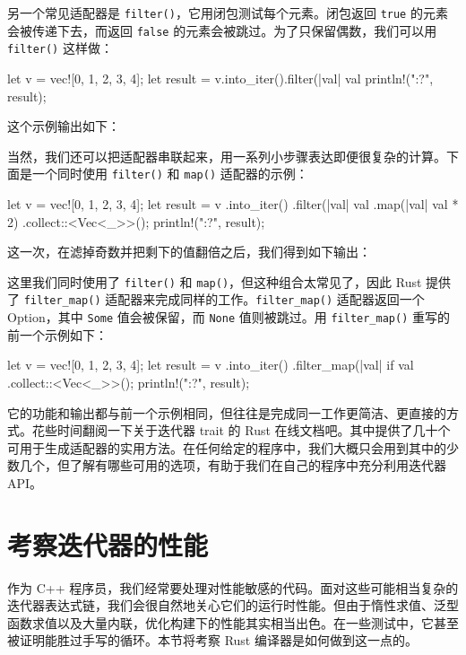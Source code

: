 另一个常见适配器是 \texttt{filter()}，它用闭包测试每个元素。闭包返回 \texttt{true} 的元素会被传递下去，而返回 \texttt{false} 的元素会被跳过。为了只保留偶数，我们可以用 \texttt{filter()} 这样做：
\begin{codebox}[rust]
let v = vec![0, 1, 2, 3, 4];
let result = v.into_iter().filter(|val| val %
println!("{:?}", result);
\end{codebox}
\label{idx:idx_025c4ede}
这个示例输出如下：
\begin{codeboxdark}
[0, 2, 4]
\end{codeboxdark}
当然，我们还可以把适配器串联起来，用一系列小步骤表达即便很复杂的计算。下面是一个同时使用 \texttt{filter()} 和 \texttt{map()} 适配器的示例：
\begin{codebox}[rust]
let v = vec![0, 1, 2, 3, 4];
let result = v
    .into_iter()
    .filter(|val| val %
    .map(|val| val * 2)
    .collect::<Vec<_>>();
println!("{:?}", result);
\end{codebox}
这一次，在滤掉奇数并把剩下的值翻倍之后，我们得到如下输出：
\begin{codeboxdark}
[0, 4, 8]
\end{codeboxdark}
这里我们同时使用了 \texttt{filter()} 和 \texttt{map()}，但这种组合太常见了，因此 Rust 提供了 \texttt{filter\_\allowbreak{}map(\allowbreak{})\allowbreak{}} 适配器来完成同样的工作。\texttt{filter\_\allowbreak{}map(\allowbreak{})\allowbreak{}} 适配器返回一个 Option，其中 \texttt{Some} 值会被保留，而 \texttt{None} 值则被跳过。用 \texttt{filter\_\allowbreak{}map(\allowbreak{})\allowbreak{}} 重写的前一个示例如下：
\begin{codebox}[rust]
let v = vec![0, 1, 2, 3, 4];
let result = v
    .into_iter()
    .filter_map(|val| if val %
    .collect::<Vec<_>>();
println!("{:?}", result);
\end{codebox}
\label{idx:idx_71df5031}
它的功能和输出都与前一个示例相同，但往往是完成同一工作更简洁、更直接的方式。花些时间翻阅一下关于迭代器 trait 的 Rust 在线文档吧。其中提供了几十个可用于生成适配器的实用方法。在任何给定的程序中，我们大概只会用到其中的少数几个，但了解有哪些可用的选项，有助于我们在自己的程序中充分利用迭代器 API。
\section{考察迭代器的性能}
\label{idx:idx_34f1c64f}
作为 C++ 程序员，我们经常要处理对性能敏感的代码。面对这些可能相当复杂的迭代器表达式链，我们会很自然地关心它们的运行时性能。但由于惰性求值、泛型函数求值以及大量内联，优化构建下的性能其实相当出色。在一些测试中，它甚至被证明能胜过手写的循环。本节将考察 Rust 编译器是如何做到这一点的。
